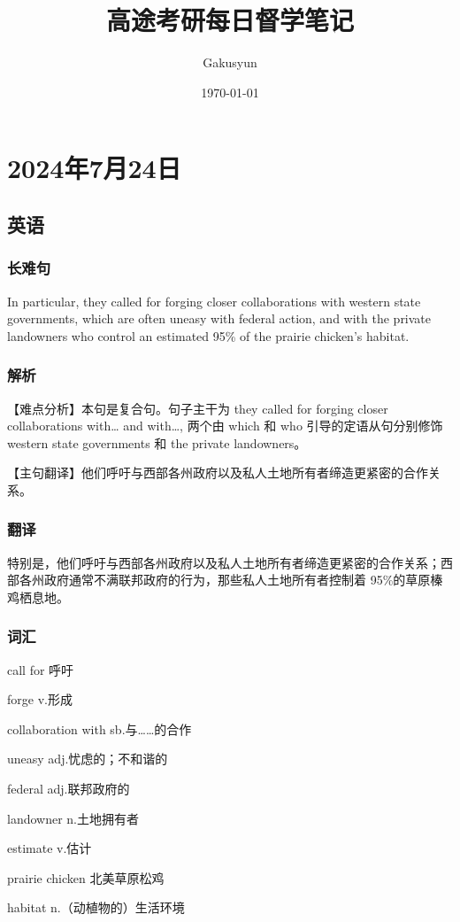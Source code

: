 \documentclass[UTF8]{ctexart}
\title{高途考研每日督学笔记}
\author{Gakusyun}
\date{\today}
\begin{document}
\maketitle
\thispagestyle{empty}
\newpage
{}
\setcounter{page}{1}
\tableofcontents
\newpage
{}
\setcounter{page}{1}
\section{2024年7月24日}
\subsection{英语}
\subsubsection{长难句}
In particular, they called for forging closer collaborations with western state
governments, which are often uneasy with federal action, and with the private
landowners who control an estimated 95\% of the prairie chicken's habitat.
\subsubsection{解析}
【难点分析】本句是复合句。句子主干为 they called for forging closer
collaborations with… and with…, 两个由 which 和 who 引导的定语从句分别修饰western state governments 和 the private landowners。

【主句翻译】他们呼吁与西部各州政府以及私人土地所有者缔造更紧密的合作关系。
\subsubsection{翻译}
特别是，他们呼吁与西部各州政府以及私人土地所有者缔造更紧密的合作关系；西部各州政府通常不满联邦政府的行为，那些私人土地所有者控制着 95\%的草原榛鸡栖息地。
\subsubsection{词汇}
\begin{multicols}{2}
      call for 呼吁

      forge v.形成

      collaboration with sb.与……的合作

      uneasy adj.忧虑的；不和谐的

      federal adj.联邦政府的

      landowner n.土地拥有者

      estimate v.估计

      prairie chicken 北美草原松鸡

      habitat n.（动植物的）生活环境
\end{multicols}
\end{document}
